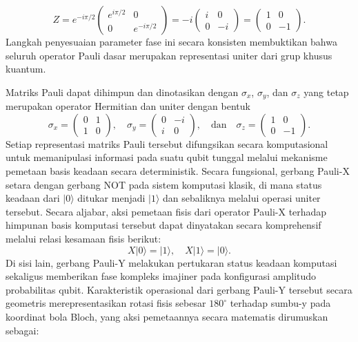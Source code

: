 \begin{equation}
Z = e^{-i\pi/2} \begin{pmatrix} e^{i\pi/2} & 0 \\ 0 & e^{-i\pi/2} \end{pmatrix} = -i \begin{pmatrix} i & 0 \\ 0 & -i \end{pmatrix} = \begin{pmatrix} 1 & 0 \\ 0 & -1 \end{pmatrix}.
\end{equation}
Langkah penyesuaian parameter fase ini secara konsisten membuktikan bahwa seluruh operator Pauli dasar merupakan representasi uniter dari grup khusus kuantum.

Matriks Pauli dapat dihimpun dan dinotasikan dengan $\sigma_x$, $\sigma_y$, dan $\sigma_z$ yang tetap merupakan operator Hermitian dan uniter dengan bentuk 
\begin{equation}
\label{eq:matriks_pauli}
\sigma_x = \begin{pmatrix} 0 & 1 \\ 1 & 0 \end{pmatrix}, \quad \sigma_y = \begin{pmatrix} 0 & -i \\ i & 0 \end{pmatrix}, \quad \text{dan} \quad \sigma_z = \begin{pmatrix} 1 & 0 \\ 0 & -1 \end{pmatrix}.
\end{equation}
Setiap representasi matriks Pauli tersebut difungsikan secara komputasional untuk memanipulasi informasi pada suatu qubit tunggal melalui mekanisme pemetaan basis keadaan secara deterministik. Secara fungsional, gerbang Pauli-X setara dengan gerbang NOT pada sistem komputasi klasik, di mana status keadaan dari $|0\rangle$ ditukar menjadi $|1\rangle$ dan sebaliknya melalui operasi uniter tersebut. Secara aljabar, aksi pemetaan fisis dari operator Pauli-X terhadap himpunan basis komputasi tersebut dapat dinyatakan secara komprehensif melalui relasi kesamaan fisis berikut:
\begin{equation}
\label{eq:aksi_paulix}
X|0\rangle = |1\rangle, \quad X|1\rangle = |0\rangle.
\end{equation}
Di sisi lain, gerbang Pauli-Y melakukan pertukaran status keadaan komputasi sekaligus memberikan fase kompleks imajiner pada konfigurasi amplitudo probabilitas qubit. Karakteristik operasional dari gerbang Pauli-Y tersebut secara geometris merepresentasikan rotasi fisis sebesar $180^\circ$ terhadap sumbu-y pada koordinat bola Bloch, yang aksi pemetaannya secara matematis dirumuskan sebagai:
